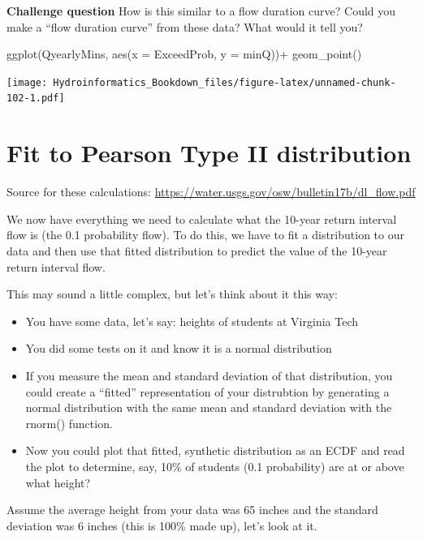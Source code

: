 \documentclass[
]{book}
\newenvironment{Shaded}{\begin{snugshade}}{\end{snugshade}}
\newcommand{\AttributeTok}[1]{\textcolor[rgb]{0.77,0.63,0.00}{#1}}
\newcommand{\FunctionTok}[1]{\textcolor[rgb]{0.00,0.00,0.00}{#1}}
\newcommand{\NormalTok}[1]{#1}
\newcommand{\SpecialCharTok}[1]{\textcolor[rgb]{0.00,0.00,0.00}{#1}}
\providecommand{\tightlist}{%
  \setlength{\itemsep}{0pt}\setlength{\parskip}{0pt}}
\begin{document}
\textbf{Challenge question} How is this similar to a flow duration curve? Could you make a ``flow duration curve'' from these data? What would it tell you?

\begin{Shaded}
\begin{Highlighting}[]
\FunctionTok{ggplot}\NormalTok{(QyearlyMins, }\FunctionTok{aes}\NormalTok{(}\AttributeTok{x =}\NormalTok{ ExceedProb, }\AttributeTok{y =}\NormalTok{ minQ))}\SpecialCharTok{+}
  \FunctionTok{geom\_point}\NormalTok{()}
\end{Highlighting}
\end{Shaded}

\texttt{[image: Hydroinformatics\_Bookdown\_files/figure-latex/unnamed-chunk-102-1.pdf]}

\hypertarget{fit-to-pearson-type-ii-distribution}{%
\section{Fit to Pearson Type II distribution}\label{fit-to-pearson-type-ii-distribution}}

Source for these calculations:
\url{https://water.usgs.gov/osw/bulletin17b/dl_flow.pdf}

We now have everything we need to calculate what the 10-year return interval flow is (the 0.1 probability flow). To do this, we have to fit a distribution to our data and then use that fitted distribution to predict the value of the 10-year return interval flow.

This may sound a little complex, but let's think about it this way:

\begin{itemize}
\tightlist
\item
  You have some data, let's say: heights of students at Virginia Tech
\item
  You did some tests on it and know it is a normal distribution
\item
  If you measure the mean and standard deviation of that distribution, you could create a ``fitted'' representation of your distrubtion by generating a normal distribution with the same mean and standard deviation with the rnorm() function.
\item
  Now you could plot that fitted, synthetic distribution as an ECDF and read the plot to determine, say, 10\% of students (0.1 probability) are at or above what height?
\end{itemize}

Assume the average height from your data was 65 inches and the standard deviation was 6 inches (this is 100\% made up), let's look at it.
\end{document}
